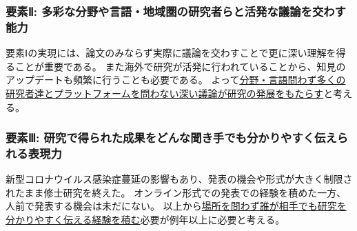 \vspace{-5mm}
\subsubsection*{要素Ⅱ: 多彩な分野や言語・地域圏の研究者らと活発な議論を交わす能力}
要素Ⅰの実現には、論文のみならず実際に議論を交わすことで更に深い理解を得ることが重要である。
また海外で研究が活発に行われていることから、知見のアップデートも頻繁に行うことも必要である。
よって\underline{分野・言語問わず多くの研究者達とプラットフォームを問わない深い議論が研究の発展をもたらす}と考える。

\vspace{-5mm}
\subsubsection*{要素Ⅲ: 研究で得られた成果をどんな聞き手でも分かりやすく伝えられる表現力}
新型コロナウイルス感染症蔓延の影響もあり、発表の機会や形式が大きく制限されたまま修士研究を終えた。
オンライン形式での発表での経験を積めた一方、人前で発表する機会は未だにない。
以上から\underline{場所を問わず誰が相手でも研究を分かりやすく伝える経験を積む}必要が例年以上に必要と考える。



